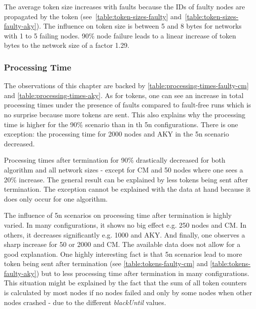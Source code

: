 The average token size increases with faults because the IDs of faulty nodes are propagated by the token (see~\cref{table:token-sizes-faulty} and~\ref{table:token-sizes-faulty-aky}).
The influence on token size is between 5 and 8 bytes for networks with 1 to 5 failing nodes.  %
90\% node failure leads to a linear increase of token bytes to the network size of a factor 1.29. %


\subsubsection{Processing Time}
The observations of this chapter are backed by \cref{table:processing-times-faulty-cm} and \ref{table:processing-times-aky}.
As for tokens, one can see an increase in total processing times under the presence of faults compared to fault-free runs which is no surprise because more tokens are sent.
This also explains why the processing time is higher for the 90\% scenario than in th 5n configurations.
There is one exception: the processing time for 2000 nodes and AKY in the 5n scenario decreased.

Processing times after termination for 90\% drastically decreased for both algorithm and all network sizes - except for CM and 50 nodes where one sees a 20\% increase.
The general result can be explained by less tokens being sent after termination.
The exception cannot be explained with the data at hand because it does only occur for one algorithm.

The influence of 5n scenarios on processing time after termination is highly varied.
In many configurations, it shows no big effect e.g. 250 nodes and CM.
In others, it decreases significantly e.g. 1000 and AKY.
And finally, one observes a sharp increase for 50 or 2000 and CM.
The available data does not allow for a good explanation.
One highly interesting fact is that 5n scenarios lead to more token being sent after termination (see \cref{table:tokens-faulty-cm} and \ref{table:tokens-faulty-aky}) but to less processing time after termination in many configurations.
This situation might be explained by the fact that the sum of all token counters is calculated by most nodes if no nodes failed and only by some nodes when other nodes crashed - due to the different \textit{blackUntil} values.


